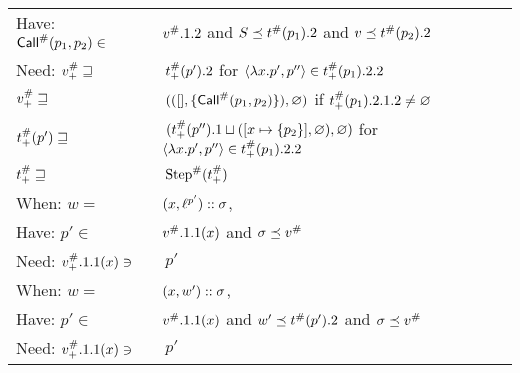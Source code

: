 \begin{center}
\begin{tabular}{|l@{\hskip2pt}l|}
    Have: \hfill ${\textsf{Call}}^{\#}(p_1,p_2)\in$            & ${v}^{\#}.1.2$ and $S\preceq{t}^{\#}(p_1).2$ and $v\preceq{t}^{\#}(p_2).2$                                                                      \\
    Need: \hfill ${v}^{\#}_+\sqsupseteq$              & $\:{t}^{\#}_+(p').2$                                                              \hfill for $\langle\lambda x.p',p''\rangle\in{t}^{\#}_+(p_1).2.2$ \\
          \hfill ${v}^{\#}_+\sqsupseteq$              & $\:(([],\{{\textsf{Call}}^{\#}(p_1,p_2)\}),\varnothing)$                                      \hfill if ${t}^{\#}_+(p_1).2.1.2\neq\varnothing$                  \\
          \hfill ${t}^{\#}_+(p')\sqsupseteq$       & $\:({t}^{\#}_+(p'').1\sqcup([x\mapsto\{p_2\}],\varnothing),\varnothing)$          \hfill for $\langle\lambda x.p',p''\rangle\in{t}^{\#}_+(p_1).2.2$ \\
          \hfill ${t}^{\#}_+\sqsupseteq$           & $\:{\text{Step}}^{\#}({t}^{\#}_+)$                                                                                                                             \\
    \hline
    When: \hfill $w=$                                & $(x,{\ell}^{p'})::\sigma$,                                                                                                                       \\
    Have: \hfill $p'\in$                             & ${v}^{\#}.1.1(x)$ and $\sigma\preceq{v}^{\#}$                                                                                                               \\
    Need: \hfill ${v}^{\#}_+.1.1(x)\ni$               & $\:p'$                                                                                                                                                  \\
    \hline
    When: \hfill $w=$                                & $(x,w')::\sigma$,                                                                                                                                      \\
    Have: \hfill $p'\in$                             & ${v}^{\#}.1.1(x)$ and $w'\preceq{t}^{\#}(p').2$ and $\sigma\preceq{v}^{\#}$                                                                               \\
    Need: \hfill ${v}^{\#}_+.1.1(x)\ni$               & $\:p'$                                                                                                                                                  \\

\end{tabular}
\end{center}
